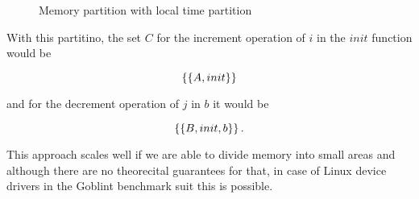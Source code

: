 \documentclass[..thesis.tex]{subfiles}
\newcommand{\opacity}{0.8}
\newcommand{\drawcube}[7]
{
      \filldraw[opacity=\opacity, #7, draw=black, dashed, xzp=#2] (#1,#3) rectangle (#4,#6);
      \filldraw[opacity=\opacity, #7, draw=black, dashed, xzp=#5] (#1,#3) rectangle (#4,#6);
      \filldraw[opacity=\opacity, #7, draw=black, dashed, xyp=#3] (#1,#2) rectangle (#4,#5);
      \filldraw[opacity=\opacity, #7, draw=black, dashed, xyp=#6] (#1,#2) rectangle (#4,#5);
      \filldraw[opacity=\opacity, #7, draw=black, dashed, yzp=#4] (#2,#3) rectangle (#5,#6);
}
\newcommand{\drawcubeoverz}[5]
{
 \drawcube{#1}{#2}{0}{#3}{#4}{\cubez}{#5}
}
\newcommand{\drawoutercube}
{
      \draw[thick,-] (0,0,0) -- ++(\cubex,0,0) -- ++(0,0,\cubez) -- node [anchor = north] {$B$} ++(-0.5*\cubex,0,0) --  node [anchor = north] {$A$} ++(-0.5*\cubex,0,0)  --   ++(0,0,-\cubez);
      \draw[thick,-] (0,\cubey,0) -- ++(\cubex,0,0) -- ++(0,0,\cubez) -- ++(-\cubex,0,0) --   ++(0,0,-\cubez)  ;

      \draw[thick,-] (0,0,0) -- (0,\cubey,0);
      \draw[thick,-] (\cubex,0,0) -- (\cubex,\cubey,0);
      \draw[thick,-] (\cubex,0,\cubez) -- ++(0,\cubey,0);
      \draw[thick,-] (0,0,\cubez) -- (0,\cubey,\cubez);
}
\newcommand{\defaultPColor}{yellow}
\newcommand{\defaultPRColor}{\defaultPColor!75}
\newcommand{\aColor}{blue}
\newcommand{\aRColor}{\aColor!75}
\newcommand{\bColor}{green}
\newcommand{\bRColor}{\bColor!95}
\newcommand{\defaultColor}{red}
\newcommand{\defaultRColor}{\defaultColor!75}
\begin{document}
\begin{figure}[H]
  \centering
    \caption{Memory partition with local time partition}
\end{figure}

With this partitino, the set $C$ for the increment operation of $i$ in the $init$ function would be

\begin{equation*}
\left\lbrace \left\lbrace A, init \right\rbrace \right\rbrace
\end{equation*}

and for the decrement operation of $j$ in $b$ it would be

\begin{equation*}
\left\lbrace \left\lbrace B, init, b \right\rbrace \right\rbrace \text{.}
\end{equation*}


This approach scales well if we are able to divide memory into small areas and although there are no theorecital guarantees for that, in case of Linux device drivers in the Goblint benchmark suit this is possible.
\end{document}
